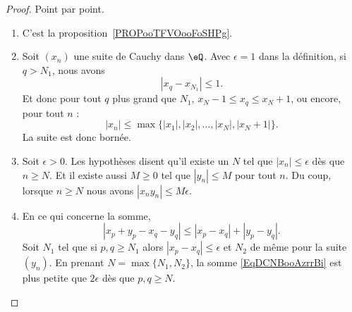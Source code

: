 \begin{proof}
    Point par point.
    \begin{enumerate}
        \item

            C'est la proposition~\ref{PROPooTFVOooFoSHPg}.

        \item
            Soit \( (x_n)\) une suite de Cauchy dans \( \eQ\). Avec \( \epsilon=1\) dans la définition, si \( q>N_1\), nous avons
            \begin{equation}
                | x_q-x_{N_1} |\leq 1.
            \end{equation}
            Et donc pour tout \( q\) plus grand que \( N_1\), \( x_N-1\leq x_q\leq x_N+1\), ou encore, pour tout \( n\) :
            \begin{equation}
                | x_n |\leq\max\{ | x_1 |,| x_2 |,\ldots,| x_N |,| x_N+1 | \}.
            \end{equation}
            La suite est donc bornée.
        \item
            Soit \(\epsilon>0\). Les hypothèses disent qu'il existe un \( N\) tel que \( | x_n |\leq \epsilon\) dès que \( n\geq N\). Et il existe aussi \( M\geq 0\) tel que \( | y_n |\leq M\) pour tout \( n\). Du coup, lorsque \( n\geq N\) nous avons \( | x_ny_n |\leq M\epsilon\).
        \item
            En ce qui concerne la somme,
            \begin{equation}        \label{EqDCNBooAzrrBi}
                | x_p+y_p-x_q-y_q |\leq | x_p-x_q |+| y_p-y_q |.
            \end{equation}
            Soit \( N_1\) tel que si \( p,q\geq N_1\) alors \( | x_p-x_q |\leq \epsilon\) et \( N_2\) de même pour la suite \( (y_n)\). En prenant \( N=\max\{ N_1,N_2 \}\), la somme \eqref{EqDCNBooAzrrBi} est plus petite que \( 2\epsilon\) dès que \( p,q\geq N\).


\end{enumerate}
\end{proof}
